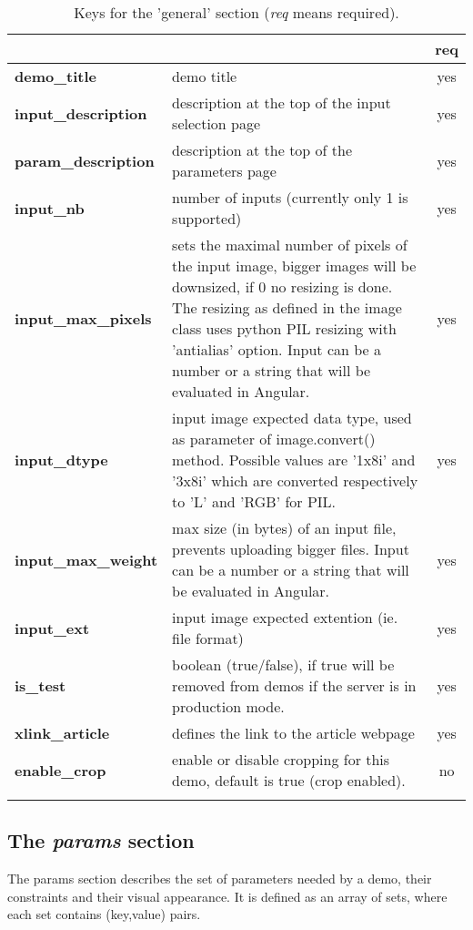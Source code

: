 \begin{longtable}{|>{\bf}L{\linewidth}|L{\linewidth}|c|}
\hline
      &  & {\bf req} 
\tabularnewline \hline \hline
 demo\_title         & demo title & yes\\ \hline
 input\_description  & description at the top of the input selection page 
                     & yes \\ \hline
 param\_description  & description at the top of the parameters page & yes
                      \\ \hline
 input\_nb           & number of inputs (currently only 1 is supported) & yes\\ 
\hline
 input\_max\_pixels & sets the maximal number of pixels of the input image, 
bigger images will be downsized, if 0 no resizing is done. The resizing as 
defined in the image class uses python PIL resizing with 'antialias' option. 
Input can be a number or a string that will be evaluated in Angular. & 
yes  \\ \hline
 input\_dtype       & input image expected data type, used as parameter of 
image.convert() method. Possible values are '1x8i' and '3x8i' which are 
converted respectively to 'L' and 'RGB' for PIL.& yes  \\ \hline
 input\_max\_weight & max size (in bytes) of an input file, prevents uploading 
bigger files. Input can be a number or a string that will be evaluated in Angular.
                    & yes  \\ \hline
 input\_ext         & input image expected extention (ie. file format) & yes  
\\ \hline
 is\_test           & boolean (true/false), if true will be removed from demos 
if the server is in production mode.& yes  \\ \hline
 xlink\_article     & defines the link to the article webpage & yes  \\ \hline
 enable\_crop       & enable or disable cropping for this demo, default is true (crop enabled). & no   \\ \hline
\caption{Keys for the 'general' section ({\em req} means required).}
\end{longtable}

\subsection{The \emph{params} section}
The params section describes the set of parameters needed by a demo, their 
constraints and their visual appearance. It is defined as an array of sets, 
where each set contains (key,value) pairs.

